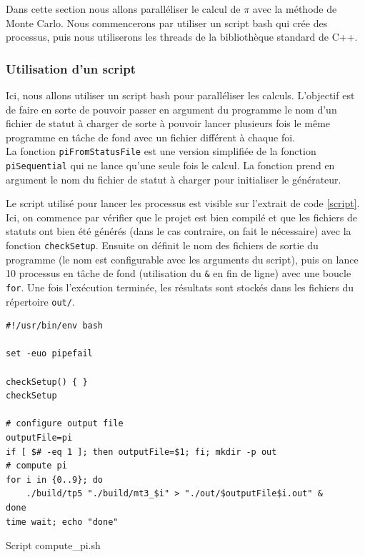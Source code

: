 \documentclass[a4paper]{article}
\begin{document}
Dans cette section nous allons paralléliser le calcul de $\pi$ avec la méthode
de Monte Carlo. Nous commencerons par utiliser un script bash qui crée des
processus, puis nous utiliserons les threads de la bibliothèque standard de C++.

\subsubsection{Utilisation d'un script}
\label{sec:script}

Ici, nous allons utiliser un script bash pour paralléliser les calculs.
L'objectif est de faire en sorte de pouvoir passer en argument du programme le
nom d'un fichier de statut à charger de sorte à pouvoir lancer plusieurs fois le
même programme en tâche de fond avec un fichier différent à chaque foi.\\

La fonction \texttt{piFromStatusFile} est une version simplifiée de la fonction
\texttt{piSequential} qui ne lance qu'une seule fois le calcul. La fonction
prend en argument le nom du fichier de statut à charger pour initialiser le
générateur.

Le script utilisé pour lancer les processus est visible sur l'extrait de code
\ref{script}. Ici, on commence par vérifier que le projet est bien compilé et
que les fichiers de statuts ont bien été générés (dans le cas contraire, on fait
le nécessaire) avec la fonction \texttt{checkSetup}. Ensuite on définit le nom
des fichiers de sortie du programme (le nom est configurable avec les arguments
du script), puis on lance 10 processus en tâche de fond (utilisation du
\texttt{\&} en fin de ligne) avec une boucle \texttt{for}. Une fois l'exécution
terminée, les résultats sont stockés dans les fichiers du répertoire
\texttt{out/}.

\begin{listing}[ht!]
\begin{verbatim}
#!/usr/bin/env bash

set -euo pipefail

checkSetup() { }
checkSetup

# configure output file
outputFile=pi
if [ $# -eq 1 ]; then outputFile=$1; fi; mkdir -p out
# compute pi
for i in {0..9}; do
    ./build/tp5 "./build/mt3_$i" > "./out/$outputFile$i.out" &
done
time wait; echo "done"
\end{verbatim}
\caption{Script compute\_pi.sh}
\label{script}
\end{listing}
\end{document}
